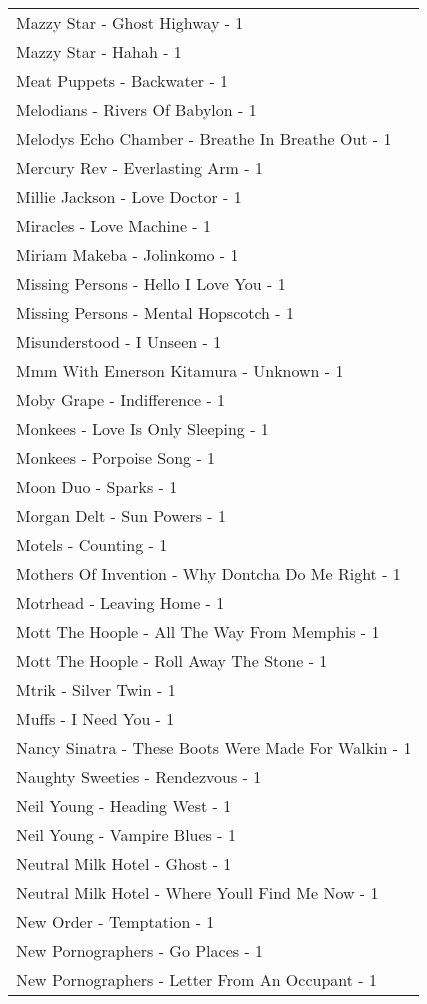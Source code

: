 \documentclass[
]{article}
\begin{document}
\begin{longtable}{l}
Mazzy Star - Ghost Highway - 1 \\ 
Mazzy Star - Hahah - 1 \\ 
Meat Puppets - Backwater - 1 \\ 
Melodians - Rivers Of Babylon - 1 \\ 
Melodys Echo Chamber - Breathe In Breathe Out - 1 \\ 
Mercury Rev - Everlasting Arm - 1 \\ 
Millie Jackson - Love Doctor - 1 \\ 
Miracles - Love Machine - 1 \\ 
Miriam Makeba - Jolinkomo - 1 \\ 
Missing Persons - Hello I Love You - 1 \\ 
Missing Persons - Mental Hopscotch - 1 \\ 
Misunderstood - I Unseen - 1 \\ 
Mmm With Emerson Kitamura - Unknown - 1 \\ 
Moby Grape - Indifference - 1 \\ 
Monkees - Love Is Only Sleeping - 1 \\ 
Monkees - Porpoise Song - 1 \\ 
Moon Duo - Sparks - 1 \\ 
Morgan Delt - Sun Powers - 1 \\ 
Motels - Counting - 1 \\ 
Mothers Of Invention - Why Dontcha Do Me Right - 1 \\ 
Motrhead - Leaving Home - 1 \\ 
Mott The Hoople - All The Way From Memphis - 1 \\ 
Mott The Hoople - Roll Away The Stone - 1 \\ 
Mtrik - Silver Twin - 1 \\ 
Muffs - I Need You - 1 \\ 
Nancy Sinatra - These Boots Were Made For Walkin - 1 \\ 
Naughty Sweeties - Rendezvous - 1 \\ 
Neil Young - Heading West - 1 \\ 
Neil Young - Vampire Blues - 1 \\ 
Neutral Milk Hotel - Ghost - 1 \\ 
Neutral Milk Hotel - Where Youll Find Me Now - 1 \\ 
New Order - Temptation - 1 \\ 
New Pornographers - Go Places - 1 \\ 
New Pornographers - Letter From An Occupant - 1 \\ 

\end{longtable}
\end{document}
